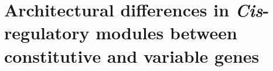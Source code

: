 \documentclass[../main.tex]{subfiles}
\begin{document}
\chapter{Architectural differences in \textit{Cis}\hyp{}regulatory modules between constitutive and variable genes}
\label{chapter1}



\end{document}

